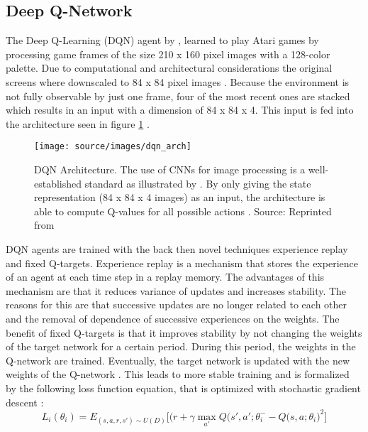 \subsection[head={DQN}, tocentry={Deep Q-Network}, reference={DQN}]{Deep Q-Network} \label{ssec:dqn}
The Deep Q-Learning (DQN) agent by , learned to play Atari games by processing game frames of the size 210 x 160 pixel images with a 128-color palette. Due to computational and architectural considerations the original screens where downscaled to 84 x 84 pixel images \cite{Krizhevsky2012}. Because the environment is not fully observable by just one frame, four of the most recent ones are stacked which results in an input with a dimension of  84 x 84 x 4. This input is fed into the architecture seen in figure \ref{fig:dqn_arch} \cite{2013arXiv1312.5602M}. 
\begin{figure}[H]%
\centering
\texttt{[image: source/images/dqn\_arch]}%
\caption[DQN Architecture]{DQN Architecture. The use of CNNs for image processing is a well-established standard as illustrated by \protect\cite{LeCun2015}. By only giving the state representation (84 x 84 x 4 images) as an input, the architecture is able to compute Q-values for all possible actions \protect\cite{2013arXiv1312.5602M}. Source: Reprinted from \protect\cite{2017arXiv170104143B}}%
\label{fig:dqn_arch}%
\end{figure}
DQN agents are trained with the back then novel techniques experience replay and fixed Q-targets. Experience replay is a mechanism that stores the experience of an agent at each time step in a replay memory. The advantages of this mechanism are that it reduces variance of updates and increases stability. The reasons for this are that successive updates are no longer related to each other and the removal of dependence of successive experiences on the weights. The benefit of fixed Q-targets is that it improves stability by not changing the weights of the target network for a certain period. During this period, the weights in the Q-network are trained. Eventually, the target network is updated with the new weights of the Q-network \cite[p. 440]{richardsutton2018}. This leads to more stable training and is formalized  by the following loss function equation, that is optimized with stochastic gradient descent \cite{Mnih2015}:
\begin{equation}
L_{i} (\theta _{i}) = E_{(s,a,r,s')\sim U(D)} \Bigg[\bigg(    r+\gamma \max_{a'} Q(s',a';\theta_{i}^{-}-Q(s,a;\theta_{i} \bigg)^2\Bigg]
\label{eq:dqnlossfnc}
\end{equation}

